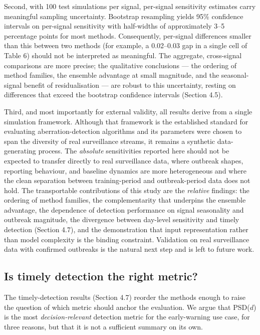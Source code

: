 \documentclass[11pt]{article}
\begin{document}
Second, with 100 test simulations per signal, per-signal sensitivity estimates carry meaningful sampling uncertainty. Bootstrap resampling yields 95\% confidence intervals on per-signal sensitivity with half-widths of approximately 3--5 percentage points for most methods. Consequently, per-signal differences smaller than this between two methods (for example, a 0.02--0.03 gap in a single cell of Table 6) should not be interpreted as meaningful. The aggregate, cross-signal comparisons are more precise; the qualitative conclusions --- the ordering of method families, the ensemble advantage at small magnitude, and the seasonal-signal benefit of residualisation --- are robust to this uncertainty, resting on differences that exceed the bootstrap confidence intervals (Section 4.5).

Third, and most importantly for external validity, all results derive from a single simulation framework. Although that framework \citep{noufaily2013} is the established standard for evaluating aberration-detection algorithms and its parameters were chosen to span the diversity of real surveillance streams, it remains a synthetic data-generating process. The \textit{absolute} sensitivities reported here should not be expected to transfer directly to real surveillance data, where outbreak shapes, reporting behaviour, and baseline dynamics are more heterogeneous and where the clean separation between training-period and outbreak-period data does not hold. The transportable contributions of this study are the \textit{relative} findings: the ordering of method families, the complementarity that underpins the ensemble advantage, the dependence of detection performance on signal seasonality and outbreak magnitude, the divergence between day-level sensitivity and timely detection (Section 4.7), and the demonstration that input representation rather than model complexity is the binding constraint. Validation on real surveillance data with confirmed outbreaks is the natural next step and is left to future work.

\subsection{Is timely detection the right metric?}

The timely-detection results (Section 4.7) reorder the methods enough to raise the question of which metric should anchor the evaluation. We argue that PSD($d$) is the most \textit{decision-relevant} detection metric for the early-warning use case, for three reasons, but that it is not a sufficient summary on its own.
\end{document}
